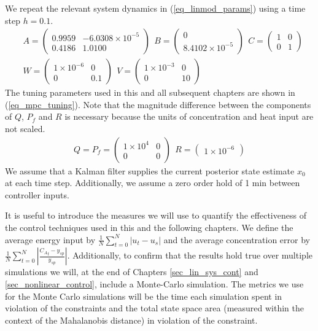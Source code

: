 We repeat the relevant system dynamics in (\ref{eq_linmod_params}) using a time step $h=0.1$. 
\begin{equation}
\begin{aligned}
&A = \begin{pmatrix}
0.9959 & -6.0308\times 10^{-5} \\
0.4186 & 1.0100
\end{pmatrix}
~~B = \begin{pmatrix}
0 \\ 8.4102\times 10^{-5}
\end{pmatrix} ~~
C = \begin{pmatrix}
1 & 0 \\ 0 & 1
\end{pmatrix} \\
&W = \begin{pmatrix}
1\times 10^{-6} & 0 \\ 0 & 0.1
\end{pmatrix} ~~
V = \begin{pmatrix}
1\times 10^{-3} & 0 \\ 0 & 10
\end{pmatrix}
\end{aligned}
\label{eq_linmod_params}
\end{equation}
The tuning parameters used in this and all subsequent chapters are shown in (\ref{eq_mpc_tuning}). Note that the magnitude difference between the components of $Q$, $P_f$ and $R$ is necessary because the units of concentration and heat input are not scaled. 
\begin{equation}
\begin{aligned}
Q = P_f = \begin{pmatrix}
1\times 10^{4} & 0 \\ 0 & 0
\end{pmatrix} 
~~R = \begin{pmatrix}
1\times 10^{-6}
\end{pmatrix}
\end{aligned}
\label{eq_mpc_tuning}
\end{equation}
We assume that a Kalman filter supplies the current posterior state estimate $x_0$ at each time step. Additionally, we assume a zero order hold of 1 min between controller inputs.

It is useful to introduce the measures we will use to quantify the effectiveness of the control techniques used in this and the following chapters. We define the average energy input by $\frac{1}{N}\sum^N_{t=0}|u_t-u_s|$ and the average concentration error by $\frac{1}{N}\sum^N_{t=0}|\frac{{C_A}_t-y_{sp}}{y_{sp}}|$. Additionally, to confirm that the results hold true over multiple simulations we will, at the end of Chapters \ref{sec_lin_sys_cont} and \ref{sec_nonlinear_control}, include a Monte-Carlo simulation. The metrics we use for the Monte Carlo simulations will be the time each simulation spent in violation of the constraints and the total state space area (measured within the context of the Mahalanobis distance) in violation of the constraint.  

